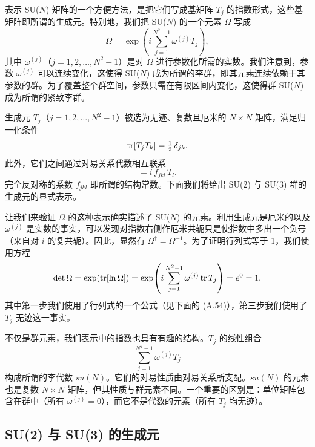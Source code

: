 表示 SU($N$) 矩阵的一个方便方法，是把它们写成基矩阵 $T_j$ 的指数形式，这些基矩阵即所谓的生成元。特别地，我们把 SU($N$) 的一个元素 $\Omega$ 写成
\begin{equation}
  \Omega = \exp\!\left(i\sum_{j=1}^{N^2-1}\omega^{(j)} T_j\right),
\end{equation}
其中 $\omega^{(j)}$（$j = 1, 2, \ldots, N^2-1$）是对 $\Omega$ 进行参数化所需的实数。我们注意到，参数 $\omega^{(j)}$ 可以连续变化，这使得 SU($N$) 成为所谓的李群，即其元素连续依赖于其参数的群。为了覆盖整个群空间，参数只需在有限区间内变化，这使得群 SU($N$) 成为所谓的紧致李群。

生成元 $T_j$（$j = 1, 2, \ldots, N^2-1$）被选为无迹、复数且厄米的 $N\times N$ 矩阵，满足归一化条件
\begin{equation}
  \operatorname{tr}[T_j T_k] = \tfrac{1}{2}\,\delta_{jk}.
\end{equation}
此外，它们之间通过对易关系代数相互联系
\begin{equation}
  [T_j, T_k] = i\, f_{jkl}\, T_l .
\end{equation}
完全反对称的系数 $f_{jkl}$ 即所谓的结构常数。下面我们将给出 SU(2) 与 SU(3) 群的生成元的显式表示。

让我们来验证 $\Omega$ 的这种表示确实描述了 SU($N$) 的元素。利用生成元是厄米的以及 $\omega^{(j)}$ 是实数的事实，可以发现对指数右侧作厄米共轭只是使指数中多出一个负号（来自对 $i$ 的复共轭）。因此，显然有 $\Omega^\dagger = \Omega^{-1}$。为了证明行列式等于 1，我们使用方程
\begin{equation}
  \det\Omega = \exp(\operatorname{tr}[\ln\Omega])
  = \exp\!\left(i\sum_{j=1}^{N^2-1}\omega^{(j)}\operatorname{tr} T_j\right) = e^0 = 1,
\end{equation}
其中第一步我们使用了行列式的一个公式（见下面的 (A.54)），第三步我们使用了 $T_j$ 无迹这一事实。

不仅是群元素，我们表示中的指数也具有有趣的结构。$T_j$ 的线性组合
\begin{equation}
  \sum_{j=1}^{N^2-1}\omega^{(j)} T_j
\end{equation}
构成所谓的李代数 $su(N)$。它们的对易性质由对易关系所支配。$su(N)$ 的元素也是复数 $N\times N$ 矩阵，但其性质与群元素不同。一个重要的区别是：单位矩阵包含在群中（所有 $\omega^{(j)} = 0$），而它不是代数的元素（所有 $T_j$ 均无迹）。

\subsection{SU(2) 与 SU(3) 的生成元}

